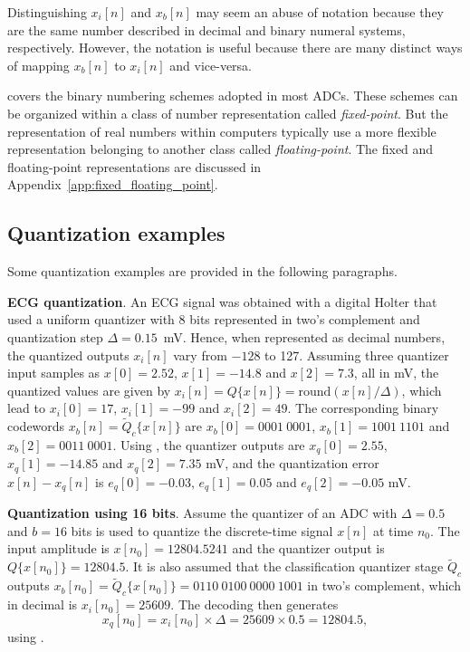 Distinguishing $x_i[n]$ and $x_b[n]$ may seem an abuse of notation because they are the same number described in decimal and binary numeral systems, respectively. However, the notation is useful because there are many distinct ways of mapping $x_b[n]$ to $x_i[n]$ and vice-versa.

 covers the binary numbering schemes adopted in most ADCs. These schemes can be organized within a class of number representation called \emph{fixed-point}. But the representation of real numbers within computers typically use a more flexible representation belonging to another class called \emph{floating-point}. The fixed and floating-point representations
are discussed in Appendix~\ref{app:fixed_floating_point}.

\subsection{Quantization examples}

Some quantization examples are provided in the following paragraphs.

\bExample \textbf{ECG quantization}.
An ECG signal was obtained with a digital Holter that used a uniform quantizer with 8 bits represented in two's complement and quantization step $\Delta=0.15$~mV. Hence, when represented as decimal numbers, the quantized outputs $x_i[n]$ vary from $-128$ to 127.
Assuming three quantizer input samples as $x[0]=2.52$, $x[1]=-14.8$ and $x[2]=7.3$, all in mV, the
quantized values are given by $x_i[n]= Q \{ x[n] \} = \textrm{round}(x[n]/\Delta)$, which lead to $x_i[0]=17$, $x_i[1]=-99$ and $x_i[2]=49$.
The corresponding binary codewords $x_b[n]= {\tilde Q}_c \{ x[n] \}$ are $x_b[0]=0001~0001$, $x_b[1]=1001~1101$ and $x_b[2]=0011~0001$.
Using , the quantizer outputs are $x_q[0]=2.55$, $x_q[1]=-14.85$ and $x_q[2]=7.35$ mV, and the quantization error $x[n]-x_q[n]$ is $e_q[0]=-0.03$, $e_q[1]=0.05$ and $e_q[2]=-0.05$ mV.
\eExample 

\bExample \textbf{Quantization using 16 bits}.
\label{ex:quantization2}
Assume the quantizer of an ADC with $\Delta=0.5$ and $b=16$ bits is used to quantize the discrete-time signal $x[n]$ at time $n_0$.  The input amplitude is $x[n_0]=12804.5241$ and the quantizer output is $Q\{x[n_0]\}=12804.5$. It is also assumed that the classification quantizer stage $\tilde Q_c$ outputs $x_b[n_0]=\tilde Q_c\{x[n_0]\}=0110~0100~0000~1001$ in two's complement, which in decimal is $x_i[n_0]=25609$. The decoding then generates
\[
x_q[n_0] = x_i[n_0] \times \Delta = 25609 \times 0.5 = 12804.5,
\] 
using .
\eExample


